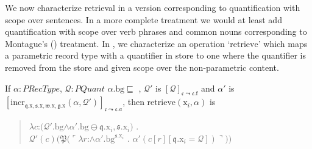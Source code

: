 We now characterize retrieval in a version corresponding to
quantification with scope over sentences.  In a more complete
treatment we would at least add quantification with scope over verb phrases
and common nouns corresponding to Montague's (\citeyear{Montague1973})
treatment.  In \nexteg{}, we characterize an operation
`$\mathrm{retrieve}$' which maps a parametric record type with a
quantifier in store to one where the quantifier is removed from the
store and given scope over the non-parametric content.

\begin{ex} 




  If $\alpha:\textit{PRecType}$, $\mathcal{Q}:\textit{PQuant}$ 
  $\alpha.\text{bg}\sqsubseteq$ , $\mathcal{Q}'$ is
$[\mathcal{Q}]_{\mathfrak{c}\leadsto\mathfrak{c}.\text{f}}$ and
$\alpha'$ is
$[\mathrm{incr}_{\mathfrak{q}.\text{x},\mathfrak{s}.\text{x},\mathfrak{w}.\text{x},\mathfrak{g}.\text{x}}(\alpha,\mathcal{Q}')]_{\mathfrak{c}\leadsto\mathfrak{c}.a}$, then
  $\mathrm{retrieve}(\text{x}_i,\alpha)$ is
  \begin{quote}
    $\lambda
    c$:$(\mathcal{Q}'.\text{bg}$\d{$\wedge$}$\alpha'.\text{bg}\ominus\mathfrak{q}.\text{x}_i,\mathfrak{s}.\text{x}_i)$
    . \\ \hspace*{2em}$\mathcal{Q'}(c)(\mathfrak{P}(\ulcorner\lambda
    r$:\d{$\wedge$}$\alpha'.\text{bg}^{\mathfrak{s}.\text{x}_i}$
    . $\alpha'(c[r][\mathfrak{q}.\text{x}_i=\mathcal{Q}])\urcorner))$
  \end{quote}
  
\end{ex}

